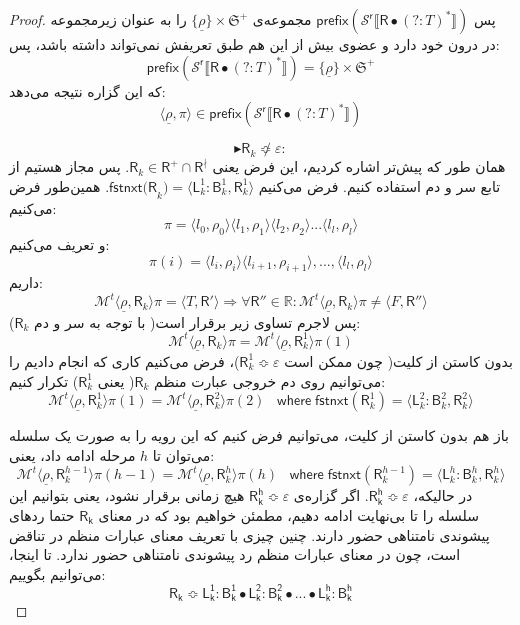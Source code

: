 \begin{proof}
پس 
$\mathsf{prefix(\mathcal{S}^r \llbracket \mathsf{R} \bullet (?:\mathit{T})^* \rrbracket)}$
مجموعه‌ی 
$\{\underline{\rho}\} \times \mathfrak{S}^+$
را به عنوان زیرمجموعه در درون خود دارد و عضوی بیش از این هم طبق تعریفش نمی‌تواند داشته باشد، پس:
$$\mathsf{prefix(\mathcal{S}^r \llbracket \mathsf{R} \bullet (?:\mathit{T})^* \rrbracket)}=
\{\underline{\rho}\} \times \mathfrak{S}^+$$
که این گزاره نتیجه می‌دهد:
$$\langle \underline{\rho}, \pi \rangle \in \mathsf{prefix(\mathcal{S}^r \llbracket \mathsf{R} \bullet (?:\mathit{T})^* \rrbracket)}$$

$$\blacktriangleright \mathsf{R}_k \not\Bumpeq \varepsilon:$$
همان طور که پیش‌تر اشاره کردیم، این فرض یعنی
$\mathsf{R}_k \in \mathsf{R}^+ \cap \mathsf{R}^\nmid$.
پس مجاز هستیم از تابع سر و دم استفاده کنیم. فرض می‌کنیم 
$\mathsf{fstnxt(R}_k) = \langle \mathsf{L}_k^1 : \mathsf{B}_k^1 , \mathsf{R}_k^1 \rangle$.
همین‌طور فرض می‌کنیم:
$$\pi = \langle l_0,\rho_0 \rangle \langle l_1 , \rho_1 \rangle \langle l_2 , \rho_2 \rangle ... \langle l_l , \rho_l \rangle$$
و تعریف می‌کنیم:
$$\pi(i)=\langle l_i , \rho_i\rangle \langle l_{i+1},\rho_{i+1}\rangle,...,\langle l_l,\rho_l \rangle$$
داریم:
$$\mathcal{M}^t \langle \underline{\rho},\mathsf{R}_k \rangle \pi = \langle \mathit{T} , \mathsf{R'} \rangle \Rightarrow \forall \mathsf{R''} \in \mathbb{R}: \mathcal{M}^t \langle \underline{\rho},\mathsf{R}_k \rangle \pi \neq \langle \mathit{F},\mathsf{R}'' \rangle$$
پس لاجرم تساوی زیر برقرار است( با توجه به سر و دم $\mathsf{R}_k$):
$$\mathcal{M}^t \langle \underline{\rho}, \mathsf{R}_k \rangle \pi= \mathcal{M}^t \langle \underline{\rho}, \mathsf{R}_k^1 \rangle \pi(1)$$
بدون کاستن از کلیت( چون ممکن است $\mathsf{R}_k^1 \Bumpeq \varepsilon$)، فرض می‌کنیم کاری که انجام دادیم را می‌توانیم روی دم خروجی عبارت منظم $\mathsf{R}_k$( یعنی $\mathsf{R}_k^1$) تکرار کنیم:
$$\mathcal{M}^t \langle \underline{\rho}, \mathsf{R}_k^1 \rangle \pi(1)= \mathcal{M}^t \langle \underline{\rho}, \mathsf{R}_k^2 \rangle \pi(2)\;\;\; \mathsf{where\;fstnxt}(\mathsf{R}_k^1)=\langle \mathsf{L}_k^2 : \mathsf{B}_k^2 , \mathsf{R}_k^2 \rangle$$

باز هم بدون کاستن از کلیت، می‌توانیم فرض کنیم که این رویه را به صورت یک سلسله می‌توان تا $h$ مرحله ادامه داد، یعنی:
$$\mathcal{M}^t \langle \underline{\rho},\mathsf{R}_k^{h-1} \rangle \pi(h-1)=\mathcal{M}^t\langle \underline{\rho},\mathsf{R}_k^{h} \rangle \pi(h) \;\;\;
\mathsf{where\;fstnxt}(\mathsf{R}_k^{h-1})=\langle \mathsf{L}_k^{h} : \mathsf{B}_k^{h} , \mathsf{R}_k^{h} \rangle$$
در حالیکه، 
$\mathsf{R_k^h} \Bumpeq \varepsilon$. 
اگر گزاره‌ی $\mathsf{R_k^h} \Bumpeq \varepsilon$ هیچ زمانی برقرار نشود، یعنی بتوانیم این سلسله را تا بی‌نهایت ادامه دهیم، مطمئن خواهیم بود که در معنای $\mathsf{R_k}$ حتما ردهای پیشوندی نامتناهی حضور دارند. چنین چیزی با تعریف معنای عبارات منظم در تناقض است، چون در معنای عبارات منظم رد پیشوندی نامتناهی حضور ندارد.
تا اینجا، می‌توانیم بگوییم:
$$\mathsf{R_k} \Bumpeq \mathsf{L_k^1 : B_k^1 \bullet L_k^2:B_k^2 \bullet ... \bullet L_k^h:B_k^h}$$


\end{proof}
